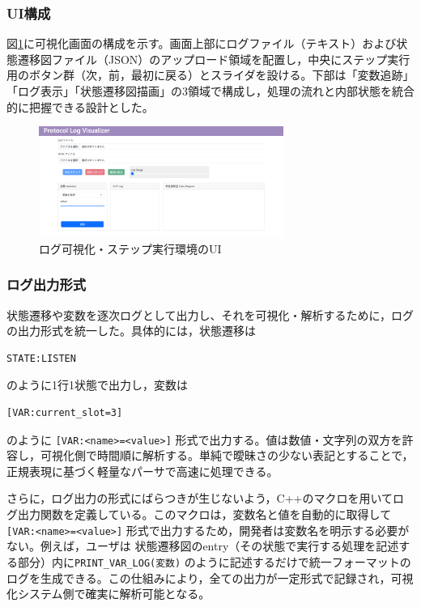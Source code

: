 \documentclass[technicalreport]{ieicej}
\begin{document}
\subsubsection{UI構成}
図\ref{fig:viewer-ui}に可視化画面の構成を示す。画面上部にログファイル（テキスト）および状態遷移図ファイル（JSON）のアップロード領域を配置し，中央にステップ実行用のボタン群（次，前，最初に戻る）とスライダを設ける。下部は「変数追跡」「ログ表示」「状態遷移図描画」の3領域で構成し，処理の流れと内部状態を統合的に把握できる設計とした。
\begin{figure}[b]
  \centering
  \includegraphics[width=80mm]{./images/viewer_ui.png}
  \caption{ログ可視化・ステップ実行環境のUI}
  \label{fig:viewer-ui}
\end{figure}

\subsubsection{ログ出力形式}
状態遷移や変数を逐次ログとして出力し、それを可視化・解析するために，ログの出力形式を統一した。具体的には，状態遷移は
\begin{verbatim}
STATE:LISTEN
\end{verbatim}
のように1行1状態で出力し，変数は
\begin{verbatim}
[VAR:current_slot=3]
\end{verbatim}
のように \verb|[VAR:<name>=<value>]| 形式で出力する。値は数値・文字列の双方を許容し，可視化側で時間順に解析する。単純で曖昧さの少ない表記とすることで，正規表現に基づく軽量なパーサで高速に処理できる。

さらに，ログ出力の形式にばらつきが生じないよう，C++のマクロを用いてログ出力関数を定義している。このマクロは，変数名と値を自動的に取得して \verb|[VAR:<name>=<value>]| 形式で出力するため，開発者は変数名を明示する必要がない。例えば，ユーザは 状態遷移図のentry（その状態で実行する処理を記述する部分）内に\verb|PRINT_VAR_LOG(変数)| のように記述するだけで統一フォーマットのログを生成できる。この仕組みにより，全ての出力が一定形式で記録され，可視化システム側で確実に解析可能となる。
\end{document}
